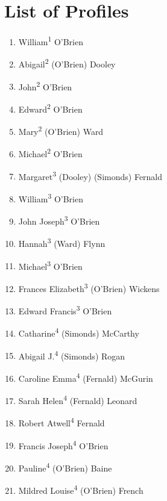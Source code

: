 \chapter{List of Profiles}
\begin{enumerate}
	\item\label{per:William1OBrien}William\textsuperscript{1} O'Brien
	\item\label{per:Abigail2OBrien}Abigail\textsuperscript{2} (O'Brien) Dooley
	\item\label{per:John2OBrien}John\textsuperscript{2} O'Brien
	\item\label{per:Edward2OBrien}Edward\textsuperscript{2} O'Brien
	\item\label{per:Mary2OBrien}Mary\textsuperscript{2} (O'Brien) Ward
	\item\label{per:Michael2OBrien}Michael\textsuperscript{2} O'Brien
	\item\label{per:Margaret3Dooley}Margaret\textsuperscript{3} (Dooley) (Simonds) Fernald
	\item\label{per:William3OBrien}William\textsuperscript{3} O'Brien
	\item\label{per:John3OBrien}John Joseph\textsuperscript{3} O'Brien
	\item\label{per:Hannah3Ward}Hannah\textsuperscript{3} (Ward) Flynn
	\item\label{per:Michael3OBrien}Michael\textsuperscript{3} O'Brien
	\item\label{per:Frances3OBrien}Frances Elizabeth\textsuperscript{3} (O'Brien) Wickens
	\item\label{per:Edward3OBrien}Edward Francis\textsuperscript{3} O'Brien
	\item\label{per:Catharine4Simonds}Catharine\textsuperscript{4} (Simonds) McCarthy
	\item\label{per:Abigail4Simonds}Abigail J.\textsuperscript{4} (Simonds) Rogan
	\item\label{per:Caroline4Fernald}Caroline Emma\textsuperscript{4} (Fernald) McGurin
	\item\label{per:Sarah4Fernald}Sarah Helen\textsuperscript{4} (Fernald) Leonard
	\item\label{per:Robert4Fernald}Robert Atwell\textsuperscript{4} Fernald
	\item\label{per:Francis4OBrien}Francis Joseph\textsuperscript{4} O'Brien
	\item\label{per:Pauline4OBrien}Pauline\textsuperscript{4} (O'Brien) Baine
	\item\label{per:Mildred4OBrien}Mildred Louise\textsuperscript{4} (O'Brien) French

\end{enumerate}
